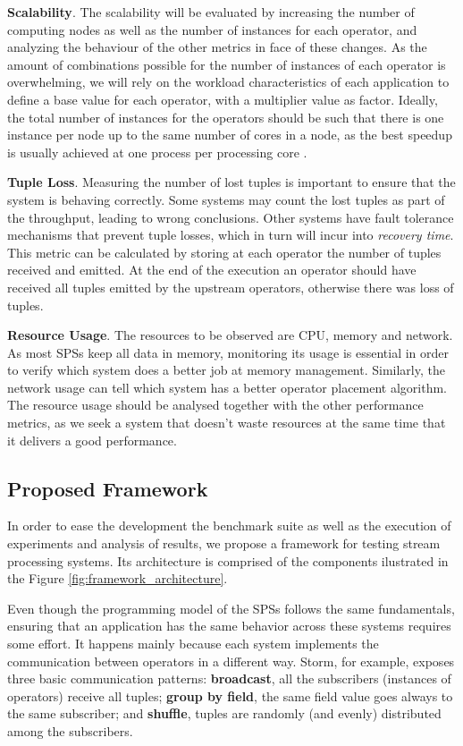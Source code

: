 \documentclass[ppgc,diss,english]{iiufrgs}
\begin{document}
\textbf{Scalability}. The scalability will be evaluated by increasing the number of computing nodes as well as the number of instances for each operator, and analyzing the behaviour of the other metrics in face of these changes. As the amount of combinations possible for the number of instances of each operator is overwhelming, we will rely on the workload characteristics of each application to define a base value for each operator, with a multiplier value as factor. Ideally, the total number of instances for the operators should be such that there is one instance per node up to the same number of cores in a node, as the best speedup is usually achieved at one process per processing core \cite{ravi2009performance, chai2007understanding}.

\textbf{Tuple Loss}. Measuring the number of lost tuples is important to ensure that the system is behaving correctly. Some systems may count the lost tuples as part of the throughput, leading to wrong conclusions. Other systems have fault tolerance mechanisms that prevent tuple losses, which in turn will incur into \emph{recovery time}. This metric can be calculated by storing at each operator the number of tuples received and emitted. At the end of the execution an operator should have received all tuples emitted by the upstream operators, otherwise there was loss of tuples.

\textbf{Resource Usage}. The resources to be observed are CPU, memory and network. As most SPSs keep all data in memory, monitoring its usage is essential in order to verify which system does a better job at memory management. Similarly, the network usage can tell which system has a better operator placement algorithm. The resource usage should be analysed together with the other performance metrics, as we seek a system that doesn't waste resources at the same time that it delivers a good performance.

\subsection{Proposed Framework}
\label{subsec:proposed-framework}

In order to ease the development the benchmark suite as well as the execution of experiments and analysis of results, we propose a framework for testing stream processing systems. Its architecture is comprised of the components ilustrated in the Figure \ref{fig:framework_architecture}.

Even though the programming model of the SPSs follows the same fundamentals, ensuring that an application has the same behavior across these systems requires some effort. It happens mainly because each system implements the communication between operators in a different way. Storm, for example, exposes three basic communication patterns: \textbf{broadcast}, all the subscribers (instances of operators) receive all tuples; \textbf{group by field}, the same field value goes always to the same subscriber; and \textbf{shuffle}, tuples are randomly (and evenly) distributed among the subscribers.
\end{document}
